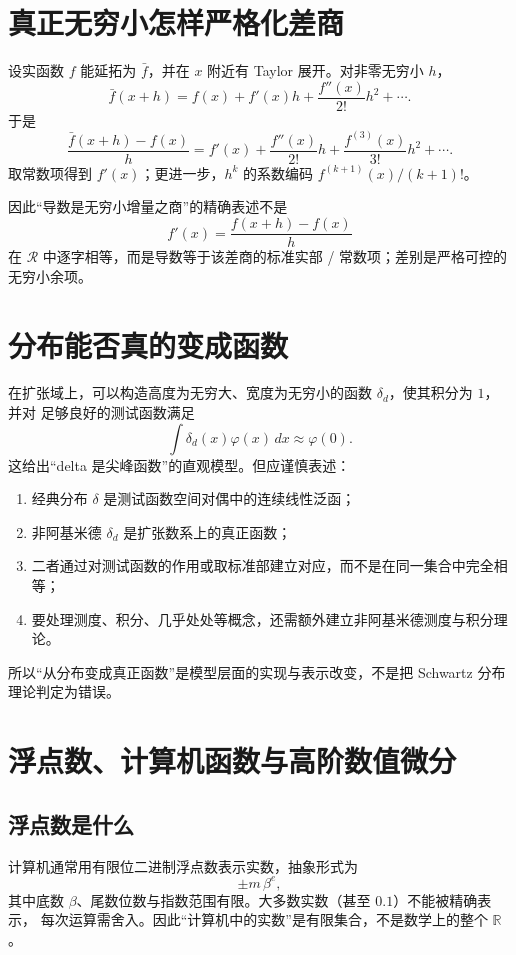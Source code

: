 \documentclass[11pt,a4paper]{article}
\theoremstyle{remark}
\newcommand{\LC}{\mathcal R}
\newcommand{\R}{\mathbb R}
\begin{document}
\section{真正无穷小怎样严格化差商}

设实函数 $f$ 能延拓为 $\bar f$，并在 $x$ 附近有 Taylor 展开。对非零无穷小 $h$，
\[
\bar f(x+h)=f(x)+f'(x)h+\frac{f''(x)}{2!}h^2+\cdots.
\]
于是
\[
\frac{\bar f(x+h)-f(x)}h
=f'(x)+\frac{f''(x)}{2!}h+\frac{f^{(3)}(x)}{3!}h^2+\cdots.
\]
取常数项得到 $f'(x)$；更进一步，$h^k$ 的系数编码 $f^{(k+1)}(x)/(k+1)!$。

因此“导数是无穷小增量之商”的精确表述不是
\[
f'(x)=\frac{f(x+h)-f(x)}h
\]
在 $\LC$ 中逐字相等，而是导数等于该差商的标准实部 / 常数项；差别是严格可控的无穷小余项。

\section{分布能否真的变成函数}

在扩张域上，可以构造高度为无穷大、宽度为无穷小的函数 $\delta_d$，使其积分为 $1$，并对
足够良好的测试函数满足
\[
\int \delta_d(x)\varphi(x)\,dx\approx\varphi(0).
\]
这给出“delta 是尖峰函数”的直观模型。但应谨慎表述：

\begin{enumerate}
\item 经典分布 $\delta$ 是测试函数空间对偶中的连续线性泛函；
\item 非阿基米德 $\delta_d$ 是扩张数系上的真正函数；
\item 二者通过对测试函数的作用或取标准部建立对应，而不是在同一集合中完全相等；
\item 要处理测度、积分、几乎处处等概念，还需额外建立非阿基米德测度与积分理论。
\end{enumerate}

所以“从分布变成真正函数”是模型层面的实现与表示改变，不是把 Schwartz 分布理论判定为错误。

\section{浮点数、计算机函数与高阶数值微分}

\subsection{浮点数是什么}

计算机通常用有限位二进制浮点数表示实数，抽象形式为
\[
\pm m\,\beta^e,
\]
其中底数 $\beta$、尾数位数与指数范围有限。大多数实数（甚至 $0.1$）不能被精确表示，
每次运算需舍入。因此“计算机中的实数”是有限集合，不是数学上的整个 $\R$。
\end{document}
